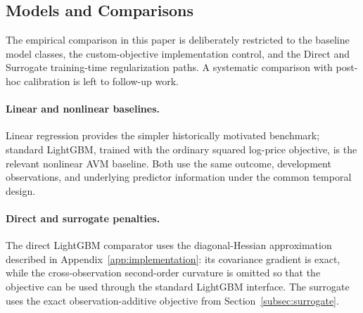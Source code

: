 \documentclass[10pt]{article}
\theoremstyle{definition}
\newcommand{\1}{\mathbf{1}}
\newcommand{\oldtext}[1]{\textcolor{blue}{\sout{#1}}}
\newcommand{\newtext}[1]{\textcolor{impGreen}{#1}}
\begin{document}
\subsection{ \newtext{Models and Comparisons}}
\label{subsec:comparators}

\newtext{The empirical comparison in this paper is deliberately restricted to the baseline model classes, the custom-objective implementation control, and the Direct and Surrogate training-time regularization paths. A systematic comparison with post-hoc calibration is left to follow-up work.}

\paragraph{Linear and nonlinear baselines.}
\textcolor{impGreen}{Linear regression provides the simpler historically motivated benchmark; standard LightGBM, trained with the ordinary squared log-price objective, is the relevant nonlinear AVM baseline. Both use the same outcome, development observations, and underlying predictor information under the common temporal design.}

\paragraph{Direct and surrogate penalties.}
\textcolor{impGreen}{The direct LightGBM comparator uses the diagonal-Hessian approximation described in Appendix~\ref{app:implementation}: its covariance gradient is exact, while the cross-observation second-order curvature is omitted so that the objective can be used through the standard LightGBM interface. The surrogate uses the exact observation-additive objective from Section~\ref{subsec:surrogate}.} 
\end{document}
